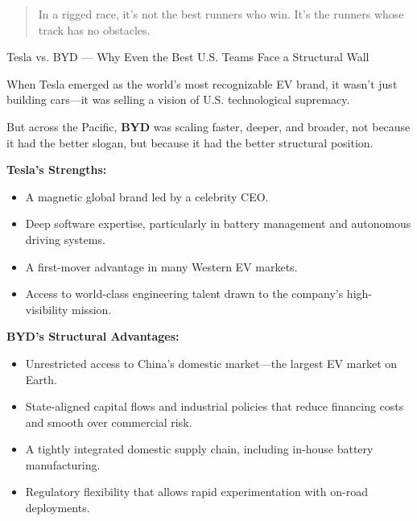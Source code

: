 \medskip

\begin{quote}
In a rigged race, it’s not the best runners who win.  It’s the runners whose track has no obstacles.
\end{quote}

\medskip

\begin{HistoricalSidebar}{Tesla vs. BYD --- Why Even the Best U.S. Teams Face a Structural Wall}

    When Tesla emerged as the world’s most recognizable EV brand, it wasn’t just building cars—it was selling a vision of U.S. technological supremacy.

    \medskip

    But across the Pacific, \textbf{BYD} was scaling faster, deeper, and broader, not because it had the better slogan, but because it had the better structural position.
    
    \medskip
    
    \textbf{Tesla’s Strengths:}

    \medskip

    \begin{itemize}
    \item A magnetic global brand led by a celebrity CEO.
    \item Deep software expertise, particularly in battery management and autonomous driving systems.
    \item A first-mover advantage in many Western EV markets.
    \item Access to world-class engineering talent drawn to the company’s high-visibility mission.
    \end{itemize}

    \medskip
    
    \textbf{BYD’s Structural Advantages:}

    \medskip

    \begin{itemize}
    \item Unrestricted access to China’s domestic market—the largest EV market on Earth.
    \item State-aligned capital flows and industrial policies that reduce financing costs and smooth over commercial risk.
    \item A tightly integrated domestic supply chain, including in-house battery manufacturing.
    \item Regulatory flexibility that allows rapid experimentation with on-road deployments.
    \end{itemize}


\end{HistoricalSidebar}
